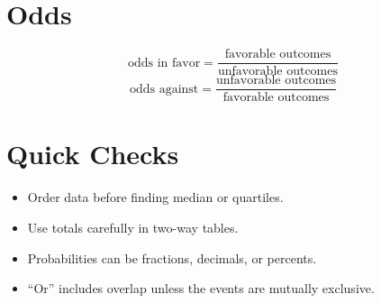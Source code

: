 \documentclass[11pt]{article}
\begin{document}
\section*{Odds}
\[
\text{odds in favor}=\frac{\text{favorable outcomes}}{\text{unfavorable outcomes}}
\]
\[
\text{odds against}=\frac{\text{unfavorable outcomes}}{\text{favorable outcomes}}
\]

\section*{Quick Checks}
\begin{itemize}
  \item Order data before finding median or quartiles.
  \item Use totals carefully in two-way tables.
  \item Probabilities can be fractions, decimals, or percents.
  \item ``Or'' includes overlap unless the events are mutually exclusive.
\end{itemize}
\end{document}
